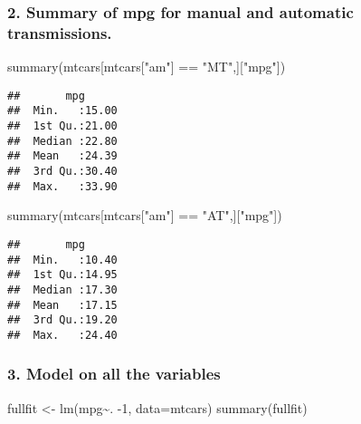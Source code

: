 \documentclass[
]{article}
\newenvironment{Shaded}{\begin{snugshade}}{\end{snugshade}}
\newcommand{\AttributeTok}[1]{\textcolor[rgb]{0.77,0.63,0.00}{#1}}
\newcommand{\DecValTok}[1]{\textcolor[rgb]{0.00,0.00,0.81}{#1}}
\newcommand{\FunctionTok}[1]{\textcolor[rgb]{0.00,0.00,0.00}{#1}}
\newcommand{\NormalTok}[1]{#1}
\newcommand{\OtherTok}[1]{\textcolor[rgb]{0.56,0.35,0.01}{#1}}
\newcommand{\SpecialCharTok}[1]{\textcolor[rgb]{0.00,0.00,0.00}{#1}}
\newcommand{\StringTok}[1]{\textcolor[rgb]{0.31,0.60,0.02}{#1}}
\begin{document}
\hypertarget{summary-of-mpg-for-manual-and-automatic-transmissions.}{%
\subsubsection{2. Summary of mpg for manual and automatic
transmissions.}\label{summary-of-mpg-for-manual-and-automatic-transmissions.}}

\begin{Shaded}
\begin{Highlighting}[]
\FunctionTok{summary}\NormalTok{(mtcars[mtcars[}\StringTok{"am"}\NormalTok{] }\SpecialCharTok{==} \StringTok{"MT"}\NormalTok{,][}\StringTok{"mpg"}\NormalTok{])}
\end{Highlighting}
\end{Shaded}

\begin{verbatim}
##       mpg       
##  Min.   :15.00  
##  1st Qu.:21.00  
##  Median :22.80  
##  Mean   :24.39  
##  3rd Qu.:30.40  
##  Max.   :33.90
\end{verbatim}

\begin{Shaded}
\begin{Highlighting}[]
\FunctionTok{summary}\NormalTok{(mtcars[mtcars[}\StringTok{"am"}\NormalTok{] }\SpecialCharTok{==} \StringTok{"AT"}\NormalTok{,][}\StringTok{"mpg"}\NormalTok{])}
\end{Highlighting}
\end{Shaded}

\begin{verbatim}
##       mpg       
##  Min.   :10.40  
##  1st Qu.:14.95  
##  Median :17.30  
##  Mean   :17.15  
##  3rd Qu.:19.20  
##  Max.   :24.40
\end{verbatim}

\hypertarget{model-on-all-the-variables}{%
\subsubsection{3. Model on all the
variables}\label{model-on-all-the-variables}}

\begin{Shaded}
\begin{Highlighting}[]
\NormalTok{fullfit }\OtherTok{\textless{}{-}} \FunctionTok{lm}\NormalTok{(mpg}\SpecialCharTok{\textasciitilde{}}\NormalTok{. }\SpecialCharTok{{-}}\DecValTok{1}\NormalTok{, }\AttributeTok{data=}\NormalTok{mtcars)}
\FunctionTok{summary}\NormalTok{(fullfit)}
\end{Highlighting}
\end{Shaded}
\end{document}
